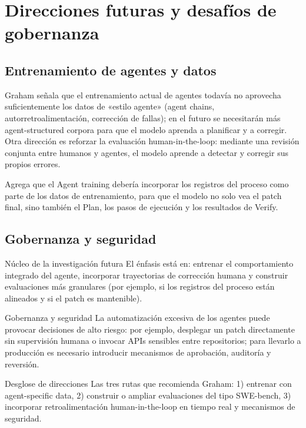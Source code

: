 \section{Direcciones futuras y desafíos de gobernanza}
\subsection{Entrenamiento de agentes y datos}
Graham señala que el entrenamiento actual de agentes todavía no aprovecha suficientemente los datos de «estilo agente» (agent chains, autorretroalimentación, corrección de fallas); en el futuro se necesitarán más agent-structured corpora para que el modelo aprenda a planificar y a corregir. Otra dirección es reforzar la evaluación human-in-the-loop: mediante una revisión conjunta entre humanos y agentes, el modelo aprende a detectar y corregir sus propios errores.

Agrega que el Agent training debería incorporar los registros del proceso como parte de los datos de entrenamiento, para que el modelo no solo vea el patch final, sino también el Plan, los pasos de ejecución y los resultados de Verify.

\subsection{Gobernanza y seguridad}
\begin{knowledgebox}{Núcleo de la investigación futura}
El énfasis está en: entrenar el comportamiento integrado del agente, incorporar trayectorias de corrección humana y construir evaluaciones más granulares (por ejemplo, si los registros del proceso están alineados y si el patch es mantenible).
\end{knowledgebox}

\begin{warningbox}{Gobernanza y seguridad}
La automatización excesiva de los agentes puede provocar decisiones de alto riesgo: por ejemplo, desplegar un patch directamente sin supervisión humana o invocar APIs sensibles entre repositorios; para llevarlo a producción es necesario introducir mecanismos de aprobación, auditoría y reversión.
\end{warningbox}

\begin{importantbox}{Desglose de direcciones}
Las tres rutas que recomienda Graham: 1) entrenar con agent-specific data, 2) construir o ampliar evaluaciones del tipo SWE-bench, 3) incorporar retroalimentación human-in-the-loop en tiempo real y mecanismos de seguridad.
\end{importantbox}

